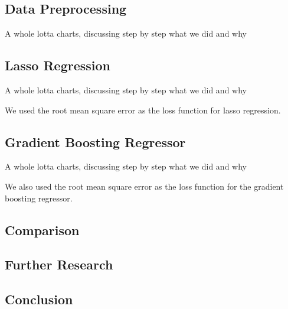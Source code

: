 \documentclass{article}
\begin{document}
\subsection{Data Preprocessing}
A whole lotta charts, discussing step by step what we did and why
\subsection{Lasso Regression}
A whole lotta charts, discussing step by step what we did and why

We used the root mean square error as the loss function for lasso regression.
\subsection{Gradient Boosting Regressor}
A whole lotta charts, discussing step by step what we did and why

We also used the root mean square error as the loss function for the gradient boosting regressor.
\subsection{Comparison}

\subsection{Further Research}
\subsection{Conclusion}

{}

\end{document}
